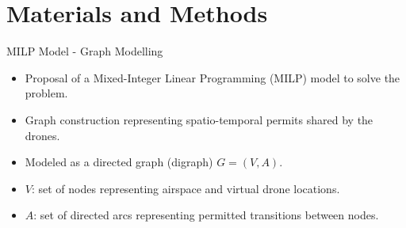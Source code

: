 
\section{Materials and Methods}

\begin{frame}{MILP Model - Graph Modelling}
    \begin{itemize}
        \item Proposal of a Mixed-Integer Linear Programming (MILP) model to solve the problem.
        \item Graph construction representing spatio-temporal permits shared by the drones.
        \item Modeled as a directed graph (digraph) $G = (V, A)$.
        \item $V$: set of nodes representing airspace and virtual drone locations.
        \item $A$: set of directed arcs representing permitted transitions between nodes.
    \end{itemize}
\end{frame}


